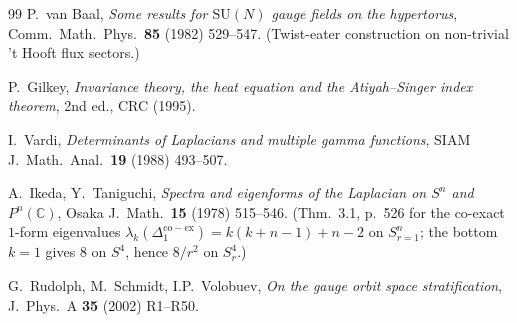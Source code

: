 \documentclass[11pt,letterpaper]{article}
\theoremstyle{definition}
\newcommand{\bbC}{\mathbb{C}}
\newcommand{\Lap}{\Delta}
\begin{document}
\begin{thebibliography}{99}
 P.\ van Baal, \emph{Some results for $\mathrm{SU}(N)$ gauge fields on the hypertorus}, Comm.\ Math.\ Phys.\ \textbf{85} (1982) 529--547. (Twist-eater construction on non-trivial 't Hooft flux sectors.)

 P.\ Gilkey, \emph{Invariance theory, the heat equation and the Atiyah--Singer index theorem}, 2nd ed., CRC (1995).

 I.\ Vardi, \emph{Determinants of Laplacians and multiple gamma functions}, SIAM J.\ Math.\ Anal.\ \textbf{19} (1988) 493--507.

 A.\ Ikeda, Y.\ Taniguchi, \emph{Spectra and eigenforms of the Laplacian on $S^n$ and $P^n(\bbC)$}, Osaka J.\ Math.\ \textbf{15} (1978) 515--546. (Thm.\ 3.1, p.\ 526 for the co-exact $1$-form eigenvalues $\lambda_k(\Lap_1^{\mathrm{co-ex}}) = k(k+n-1) + n - 2$ on $S^n_{r=1}$; the bottom $k=1$ gives $8$ on $S^4$, hence $8/r^2$ on $S^4_r$.)

 G.\ Rudolph, M.\ Schmidt, I.P.\ Volobuev, \emph{On the gauge orbit space stratification}, J.\ Phys.\ A \textbf{35} (2002) R1--R50.

\end{thebibliography}
\end{document}
